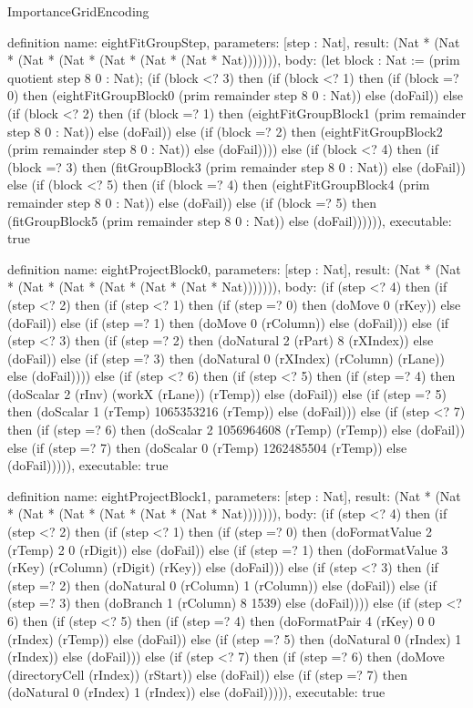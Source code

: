 \begin{lexlean}{ImportanceGridEncoding}
\begin{semanticmodule}
definition{
  name: eightFitGroupStep,
  parameters: [step : Nat],
  result: (Nat * (Nat * (Nat * (Nat * (Nat * (Nat * (Nat * Nat))))))),
  body: (let block : Nat := (prim quotient step 8 0 : Nat); (if (block <? 3) then
      (if (block <? 1) then
      (if (block =? 0) then (eightFitGroupBlock0 (prim remainder step 8 0 : Nat)) else (doFail)) else
      (if (block <? 2) then
      (if (block =? 1) then (eightFitGroupBlock1 (prim remainder step 8 0 : Nat)) else (doFail)) else
      (if (block =? 2) then (eightFitGroupBlock2 (prim remainder step 8 0 : Nat)) else (doFail)))) else
      (if (block <? 4) then
      (if (block =? 3) then (fitGroupBlock3 (prim remainder step 8 0 : Nat)) else (doFail)) else
      (if (block <? 5) then
      (if (block =? 4) then (eightFitGroupBlock4 (prim remainder step 8 0 : Nat)) else (doFail)) else
      (if (block =? 5) then (fitGroupBlock5 (prim remainder step 8 0 : Nat)) else (doFail)))))),
  executable: true
}

definition{
  name: eightProjectBlock0,
  parameters: [step : Nat],
  result: (Nat * (Nat * (Nat * (Nat * (Nat * (Nat * (Nat * Nat))))))),
  body: (if (step <? 4) then
      (if (step <? 2) then
      (if (step <? 1) then
      (if (step =? 0) then (doMove 0 (rKey)) else (doFail)) else
      (if (step =? 1) then (doMove 0 (rColumn)) else (doFail))) else
      (if (step <? 3) then
      (if (step =? 2) then (doNatural 2 (rPart) 8 (rXIndex)) else (doFail)) else
      (if (step =? 3) then (doNatural 0 (rXIndex) (rColumn) (rLane)) else (doFail)))) else
      (if (step <? 6) then
      (if (step <? 5) then
      (if (step =? 4) then (doScalar 2 (rInv) (workX (rLane)) (rTemp)) else (doFail)) else
      (if (step =? 5) then (doScalar 1 (rTemp) 1065353216 (rTemp)) else (doFail))) else
      (if (step <? 7) then
      (if (step =? 6) then (doScalar 2 1056964608 (rTemp) (rTemp)) else (doFail)) else
      (if (step =? 7) then (doScalar 0 (rTemp) 1262485504 (rTemp)) else (doFail))))),
  executable: true
}

definition{
  name: eightProjectBlock1,
  parameters: [step : Nat],
  result: (Nat * (Nat * (Nat * (Nat * (Nat * (Nat * (Nat * Nat))))))),
  body: (if (step <? 4) then
      (if (step <? 2) then
      (if (step <? 1) then
      (if (step =? 0) then (doFormatValue 2 (rTemp) 2 0 (rDigit)) else (doFail)) else
      (if (step =? 1) then (doFormatValue 3 (rKey) (rColumn) (rDigit) (rKey)) else (doFail))) else
      (if (step <? 3) then
      (if (step =? 2) then (doNatural 0 (rColumn) 1 (rColumn)) else (doFail)) else
      (if (step =? 3) then (doBranch 1 (rColumn) 8 1539) else (doFail)))) else
      (if (step <? 6) then
      (if (step <? 5) then
      (if (step =? 4) then (doFormatPair 4 (rKey) 0 0 (rIndex) (rTemp)) else (doFail)) else
      (if (step =? 5) then (doNatural 0 (rIndex) 1 (rIndex)) else (doFail))) else
      (if (step <? 7) then
      (if (step =? 6) then (doMove (directoryCell (rIndex)) (rStart)) else (doFail)) else
      (if (step =? 7) then (doNatural 0 (rIndex) 1 (rIndex)) else (doFail))))),
  executable: true
}


\end{semanticmodule}
\end{lexlean}
